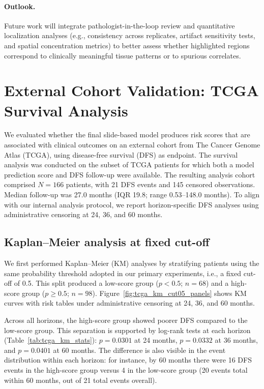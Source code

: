 \paragraph{Outlook.}
Future work will integrate pathologist-in-the-loop review and quantitative localization analyses (e.g., consistency across replicates, artifact sensitivity tests, and spatial concentration metrics) to better assess whether highlighted regions correspond to clinically meaningful tissue patterns or to spurious correlates.


\section{External Cohort Validation: TCGA Survival Analysis}
\label{sec:tcga_survival_results}

We evaluated whether the final slide-based model produces risk scores that are associated with clinical outcomes on an external cohort from The Cancer Genome Atlas (TCGA), using disease-free survival (DFS) as endpoint. The survival analysis was conducted on the subset of TCGA patients for which both a model prediction score and DFS follow-up were available. The resulting analysis cohort comprised $N=166$ patients, with 21 DFS events and 145 censored observations. Median follow-up was 27.0 months (IQR 19.8; range 0.53--148.0 months).
To align with our internal analysis protocol, we report horizon-specific DFS analyses using administrative censoring at 24, 36, and 60 months.

\subsection{Kaplan--Meier analysis at fixed cut-off}
\label{sec:tcga_km_cut05}

We first performed Kaplan--Meier (KM) analyses by stratifying patients using the same probability threshold adopted in our primary experiments, i.e., a fixed cut-off of 0.5. This split produced a low-score group ($p < 0.5$; $n=68$) and a high-score group ($p \ge 0.5$; $n=98$). Figure~\ref{fig:tcga_km_cut05_panels} shows KM curves with risk tables under administrative censoring at 24, 36, and 60 months.

Across all horizons, the high-score group showed poorer DFS compared to the low-score group. This separation is supported by log-rank tests at each horizon (Table~\ref{tab:tcga_km_stats}): $p=0.0301$ at 24 months, $p=0.0332$ at 36 months, and $p=0.0401$ at 60 months. The difference is also visible in the event distribution within each horizon: for instance, by 60 months there were 16 DFS events in the high-score group versus 4 in the low-score group (20 events total within 60 months, out of 21 total events overall).

